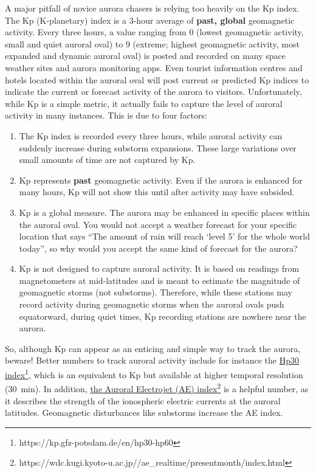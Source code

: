 \documentclass{article}
\begin{document}
A major pitfall of novice aurora chasers is relying too heavily on the Kp index. The Kp (K-planetary) index is a 3-hour average of \textbf{past, global} geomagnetic activity. Every three hours, a value ranging from 0 (lowest geomagnetic activity, small and quiet auroral oval) to 9 (extreme; highest geomagnetic activity, most expanded and dynamic auroral oval) is posted and recorded on many space weather sites and aurora monitoring apps. Even tourist information centres and hotels located within the auroral oval will post current or predicted Kp indices to indicate the current or forecast activity of the aurora to visitors. Unfortunately, while Kp is a simple metric, it actually fails to capture the level of auroral activity in many instances. This is due to four factors:
\begin{enumerate}
    \item The Kp index is recorded every three hours, while auroral activity can suddenly increase during substorm expansions. These large variations over small amounts of time are not captured by Kp.
    \item Kp represents \textbf{past} geomagnetic activity. Even if the aurora is enhanced for many hours, Kp will not show this until after activity may have subsided.
    \item Kp is a global measure. The aurora may be enhanced in specific places within the auroral oval. You would not accept a weather forecast for your specific location that says ``The amount of rain will reach `level 5' for the whole world today'', so why would you accept the same kind of forecast for the aurora?
    \item Kp is not designed to capture auroral activity. It is based on readings from magnetometers at mid-latitudes and is meant to estimate the magnitude of geomagnetic storms (not substorms). Therefore, while these stations may record activity during geomagnetic storms when the auroral ovals push equatorward, during quiet times, Kp recording stations are nowhere near the aurora.
\end{enumerate}
So, although Kp can appear as an enticing and simple way to track the aurora, beware! 
Better numbers to track auroral activity include for instance the \href{https://kp.gfz-potsdam.de/en/hp30-hp60}{Hp30 index}\footnote{https://kp.gfz-potsdam.de/en/hp30-hp60}, which is an equivalent to Kp but available at higher temporal resolution (30~min). In addition, \href{http://wdc.kugi.kyoto-u.ac.jp/ae_realtime/presentmonth/index.html}{the Auroral Electrojet (AE) index}\footnote{https://wdc.kugi.kyoto-u.ac.jp//ae\_realtime/presentmonth/index.html} is a helpful number, as it describes the strength of the ionospheric electric currents at the auroral latitudes. Geomagnetic disturbances like substorms increase the AE index.
\end{document}
